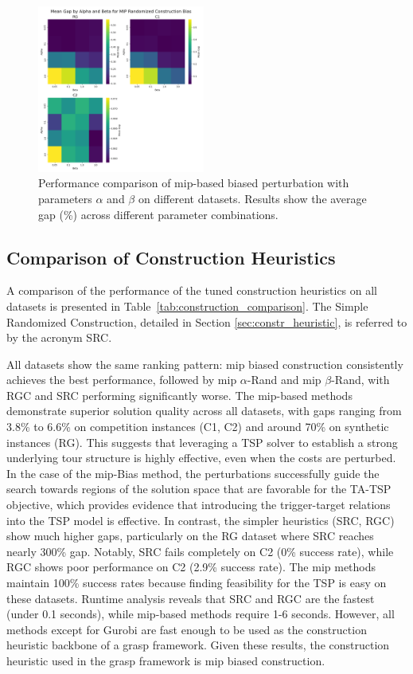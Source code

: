 \documentclass[twocolumn, switch]{article} %
\begin{document}
\begin{figure}[h]
    \centering
    \includegraphics[width=0.49\textwidth]{figures/alpha_beta_grid_mip_randomized_construction_bias.png}
    \caption{Performance comparison of \gls{mip}-based biased perturbation with parameters $\alpha$ and $\beta$ on different datasets. Results show the average gap (\%) across different parameter combinations.}
    \label{fig:alpha_beta_grid_mip_randomized_construction_bias} 
\end{figure} 

\subsection{Comparison of Construction Heuristics}

A comparison of the performance of the tuned construction heuristics on all datasets is presented in Table~\ref{tab:construction_comparison}.
The Simple Randomized Construction, detailed in Section \ref{sec:constr_heuristic}, is referred to by the acronym SRC.

All datasets show the same ranking pattern: \gls{mip} biased construction consistently achieves the best performance, followed by \gls{mip} $\alpha$-Rand and \gls{mip} $\beta$-Rand, with RGC and SRC performing significantly worse.
The \gls{mip}-based methods demonstrate superior solution quality across all datasets, with gaps ranging from 3.8\% to 6.6\% on competition instances (C1, C2) and around 70\% on synthetic instances (RG).
This suggests that leveraging a TSP solver to establish a strong underlying tour structure is highly effective, even when the costs are perturbed.
In the case of the \gls{mip}-Bias method, the perturbations successfully guide the search towards regions of the solution space that are favorable for the TA-TSP objective, which provides evidence that introducing the trigger-target relations into the TSP model is effective.
In contrast, the simpler heuristics (SRC, RGC) show much higher gaps, particularly on the RG dataset where SRC reaches nearly 300\% gap. Notably, SRC fails completely on C2 (0\% success rate), while RGC shows poor performance on C2 (2.9\% success rate).
The \gls{mip} methods maintain 100\% success rates because finding feasibility for the TSP is easy on these datasets.
Runtime analysis reveals that SRC and RGC are the fastest (under 0.1 seconds), while \gls{mip}-based methods require 1-6 seconds.
However, all methods except for Gurobi are fast enough to be used as the construction heuristic backbone of a \gls{grasp} framework.
Given these results, the construction heuristic used in the \gls{grasp} framework is \gls{mip} biased construction.
\end{document}
